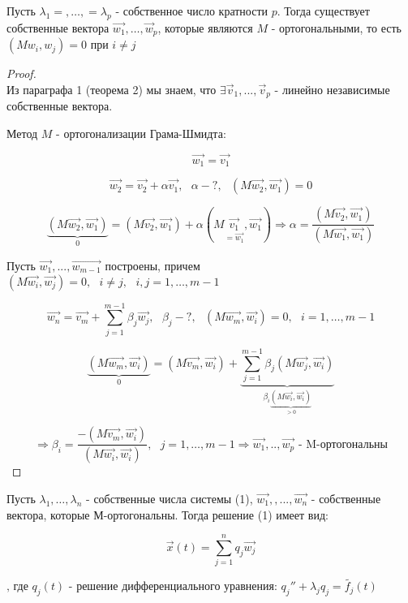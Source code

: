 \documentclass[12pt, a4paper]{report}
\begin{document}
\begin{theorem}
    Пусть \( \lambda_1=, \ldots, =\lambda_p \) - собственное число кратности \( p \). Тогда существует собственные вектора \( \vec{w_1} , \ldots,\vec{w } _{p}   \), которые являются \( M  \)   - ортогональными, то есть \( (M w_i, w_j ) = 0  \) при \( i \neq j \) 
\end{theorem}


\begin{proof}

\[  \] 
    Из параграфа 1 (теорема 2) мы знаем, что \( \exists  \vec{v } _1 ,..., \vec{v } _p  \) - линейно независимые собственные вектора. 
    
    Метод \( M \) - ортогонализации Грама-Шмидта: 

    \[\vec{w_1 } = \vec{v_1 }    \] 

    \[ \vec{w_2 } = \vec{v_2 } + \alpha \vec{v_1 } , \text{ }  \alpha - ? , \text{  } ( M \vec{w_2 }, \vec{w_1 }  ) = 0    \] 

    \[ \underbrace{(M \vec{w_2 }, \vec{w_1}  ) }_{0}= (M\vec{v_2 }, \vec{w_1 }  ) + \alpha (M \underset{=\vec{w_1}}{\vec{v_1 }}, \vec{w_1}   )  \Rightarrow \alpha = \frac{ (M \vec{v_2 }, \vec{w_1}  )}{(M \vec{w_1 }, \vec{w_1}  )} \] 

    Пусть \( \vec{w_1 },..., \vec{w_{m-1} }    \) построены, причем \( (M \vec{w_i } , \vec{w_j}  )= 0 ,\text{ } i \neq j , \text{ } i,j= 1, \ldots, m-1 \) 

    \[ \vec{w_n } = \vec{v_m }+ \sum_{j =1}^{m -1 }  \beta_j \vec{w_j } , \text{ } \beta_j -? , \text{ } (M \vec{w_m }, \vec{w_i}  ) = 0, \text{ } i=1, \ldots, m-1    \]
    
    \[ \underbrace{(M \vec{w_m } , \vec{w_i }  )}_{0} = (M \vec{v_m }, \vec{w_i} ) +\underbrace{ \sum_{j =1}^{m-1 } \beta_j (M\vec{w_j }, \vec{w_i}  )}_{\beta_i \underbrace{(M\vec{w_i }, \vec{w_i }  )}_{>0}}  \] 

    \[ \Rightarrow \beta_i = \frac{ - (M \vec{v_m }, \vec{w_i }  )}{(M \vec{w_i }, \vec{w_i}  )}  ,\text{ }  j= 1, \ldots, m-1  \Rightarrow \vec{w_1 },.., \vec{w_p} \text{ - M-ортогональны}   \] 
\end{proof}

\begin{theorem}
    Пусть \( \lambda_1, \ldots, \lambda_n \)  - собственные числа системы (1), \( \vec{w_1 }, ,..., \vec{w_n}   \) - собственные вектора, которые М-ортогональны. Тогда решение (1) имеет вид: 

    \[ \vec{x } (t ) = \sum_{j =1}^{n } q_j \vec{w_j }  \] 

    \(\text{, где }  q_j (t ) \text{ - решение дифференциального уравнения: }  q_j '' + \lambda_j q_j = \tilde{f_j }(t) \) 
\end{theorem}
\end{document}
